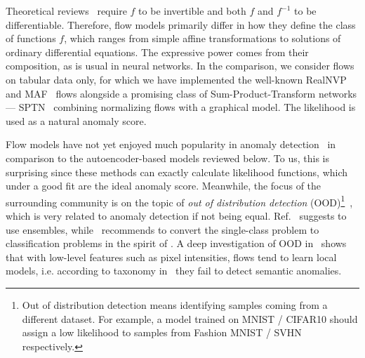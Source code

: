 Theoretical reviews~\cite{papamakariosNormalizingFlowsProbabilistic2019, kobyzevNormalizingFlowsIntroduction2020} require $f$ to be invertible and both $f$ and $f^{-1}$ to be differentiable. Therefore, flow models primarily differ in how they define the class of functions $f$, which ranges from simple affine transformations to solutions of ordinary differential equations. The expressive power comes from their composition, as is usual in neural networks. In the comparison, we consider flows on tabular data only, for which we have implemented the well-known RealNVP~\cite{dinh2016density} and MAF~\cite{papamakariosMaskedAutoregressiveFlow2018} flows alongside a promising class of Sum-Product-Transform networks --- SPTN~\cite{pevny2020sum} combining normalizing flows with a graphical model. The likelihood is used as a natural anomaly score.

Flow models have not yet enjoyed much popularity in anomaly detection~\cite{yamaguchi2019adaflow, schmidtNormalizingFlowsNovelty2019, diasAnomalyDetectionTrajectory2020a, pevny2020sum} in comparison to the autoencoder-based models reviewed below. To us, this is surprising since these methods can exactly calculate likelihood functions, which under a good fit are the ideal anomaly score. Meanwhile, the focus of the surrounding community is on the topic of \textit{out of distribution detection} (OOD)\footnote{Out of distribution detection means identifying samples coming from a different dataset. For example, a model trained on MNIST / CIFAR10 should assign a low likelihood to samples from Fashion MNIST / SVHN respectively.}~\cite{nalisnickDeepGenerativeModels2019}, which is very related to anomaly detection if not being equal. Ref.~\cite{choiWAICWhyGenerative2019} suggests to use ensembles, while~\cite{renLikelihoodRatiosOutofDistribution2019} recommends to convert the single-class problem to classification problems in the spirit of \cite{steinwart2005a}. A deep investigation of OOD in~\cite{kirichenkoWhyNormalizingFlows2020} shows that with low-level features such as pixel intensities, flows tend to learn local models, i.e. according to taxonomy in~\cite{ruff2020unifying} they fail to detect semantic anomalies.

